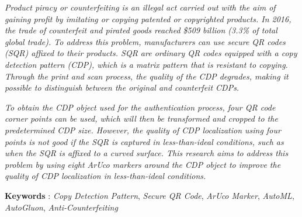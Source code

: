 \textit{
	Product piracy or counterfeiting is an illegal act carried out with the aim of gaining profit by imitating or copying patented or copyrighted products. In 2016, the trade of counterfeit and pirated goods reached \$509 billion (3.3\% of total global trade). To address this problem, manufacturers can use secure QR codes (SQR) affixed to their products. SQR are ordinary QR codes equipped with a copy detection pattern (CDP), which is a matrix pattern that is resistant to copying. Through the print and scan process, the quality of the CDP degrades, making it possible to distinguish between the original and counterfeit CDPs.
}

\textit{
	To obtain the CDP object used for the authentication process, four QR code corner points can be used, which will then be transformed and cropped to the predetermined CDP size. However, the quality of CDP localization using four points is not good if the SQR is captured in less-than-ideal conditions, such as when the SQR is affixed to a curved surface. This research aims to address this problem by using eight ArUco markers around the CDP object to improve the quality of CDP localization in less-than-ideal conditions.
}

\noindent\textbf{Keywords} : \emph{Copy Detection Pattern}, \emph{Secure QR Code}, \emph{ArUco Marker}, \emph{AutoML}, \emph{AutoGluon}, \emph{Anti-Counterfeiting}
